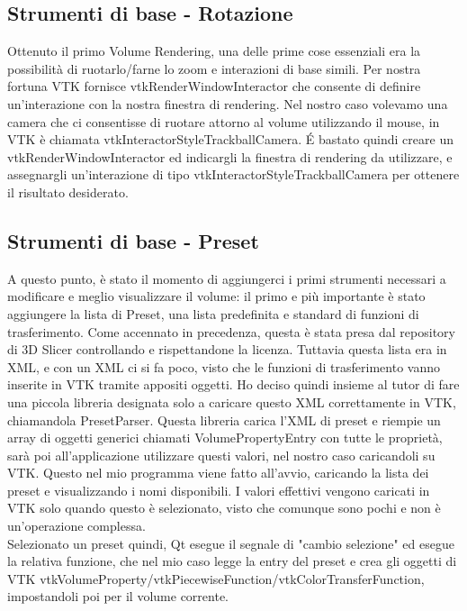 \subsection{Strumenti di base - Rotazione}
Ottenuto il primo Volume Rendering, una delle prime cose essenziali era la possibilità di ruotarlo/farne lo zoom e interazioni di base simili. Per nostra fortuna VTK fornisce vtkRenderWindowInteractor che consente di definire un'interazione con la nostra finestra di rendering. Nel nostro caso volevamo una camera che ci consentisse di ruotare attorno al volume utilizzando il mouse, in VTK è chiamata vtkInteractorStyleTrackballCamera. \'E bastato quindi creare un vtkRenderWindowInteractor ed indicargli la finestra di rendering da utilizzare, e assegnargli un'interazione di tipo vtkInteractorStyleTrackballCamera per ottenere il risultato desiderato.

\subsection{Strumenti di base - Preset}
A questo punto, è stato il momento di aggiungerci i primi strumenti necessari a modificare e meglio visualizzare il volume: il primo e più importante è stato aggiungere la lista di Preset, una lista predefinita e standard di funzioni di trasferimento. Come accennato in precedenza, questa è stata presa dal repository di 3D Slicer controllando e rispettandone la licenza. Tuttavia questa lista era in XML, e con un XML ci si fa poco, visto che le funzioni di trasferimento vanno inserite in VTK tramite appositi oggetti. Ho deciso quindi insieme al tutor di fare una piccola libreria designata solo a caricare questo XML correttamente in VTK, chiamandola PresetParser. Questa libreria carica l'XML di preset e riempie un array di oggetti generici chiamati VolumePropertyEntry con tutte le proprietà, sarà poi all'applicazione utilizzare questi valori, nel nostro caso caricandoli su VTK. Questo nel mio programma viene fatto all'avvio, caricando la lista dei preset e visualizzando i nomi disponibili. I valori effettivi vengono caricati in VTK solo quando questo è selezionato, visto che comunque sono pochi e non è un'operazione complessa.
\\
Selezionato un preset quindi, Qt esegue il segnale di "cambio selezione" ed esegue la relativa funzione, che nel mio caso legge la entry del preset e crea gli oggetti di VTK vtkVolumeProperty/vtkPiecewiseFunction/vtkColorTransferFunction, impostandoli poi per il volume corrente.

